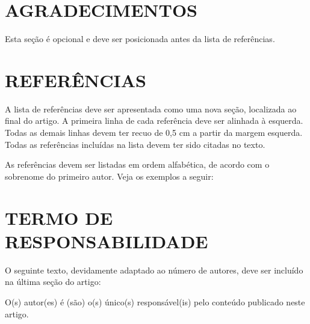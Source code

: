 \documentclass[10pt,fleqn,a4paper,twoside]{article}
\begin{document}
\section{AGRADECIMENTOS}
Esta seção é opcional e deve ser posicionada antes da lista de referências.

\section{REFERÊNCIAS} 

A lista de referências deve ser apresentada como uma nova seção, localizada ao final do artigo. A primeira linha de cada referência deve ser alinhada à esquerda. Todas as demais linhas devem ter recuo de 0,5 cm a partir da margem esquerda. Todas as referências incluídas na lista devem ter sido citadas no texto.

As referências devem ser listadas em ordem alfabética, de acordo com o sobrenome do primeiro autor. Veja os exemplos a seguir:


\renewcommand{\refname}{}


\section{TERMO DE RESPONSABILIDADE}

O seguinte texto, devidamente adaptado ao número de autores, deve ser incluído na última seção do artigo:

O(s) autor(es) é (são) o(s) único(s) responsável(is) pelo conteúdo publicado neste artigo.
\end{document}
